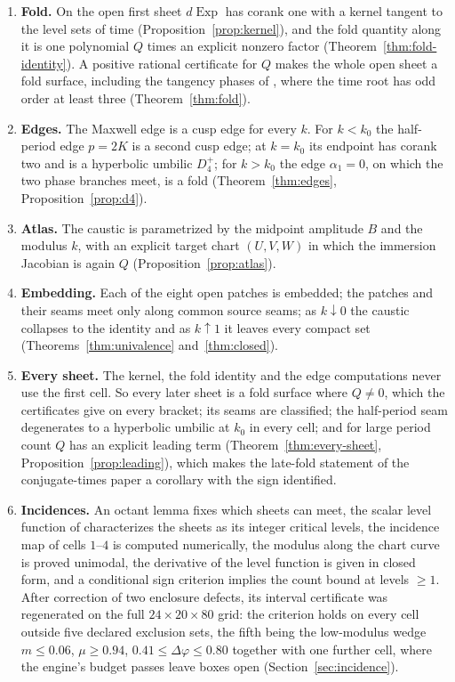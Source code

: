 \documentclass[11pt]{article}
\theoremstyle{remark}
\newcommand{\Exp}{\operatorname{Exp}}
\begin{document}
\begin{enumerate}[nosep,leftmargin=*]
\item \textbf{Fold.}  On the open first sheet $d\Exp$ has corank one with a
      kernel tangent to the level sets of time
      (Proposition~\ref{prop:kernel}), and the fold quantity along it is
      one polynomial $Q$ times an explicit nonzero factor
      (Theorem~\ref{thm:fold-identity}).  A positive rational certificate
      for $Q$ makes the whole open sheet a fold surface, including the
      tangency phases of \cite[Lemma~3.3]{SE2FirstConjugate}, where the
      time root has odd order at least three (Theorem~\ref{thm:fold}).
\item \textbf{Edges.}  The Maxwell edge is a cusp edge for every $k$.  For
      $k<k_0$ the half-period edge $p=2K$ is a second cusp edge; at
      $k=k_0$ its endpoint has corank two and is a hyperbolic umbilic
      $D_4^+$; for $k>k_0$ the edge $\alpha_1=0$, on which the two phase
      branches meet, is a fold (Theorem~\ref{thm:edges},
      Proposition~\ref{prop:d4}).
\item \textbf{Atlas.}  The caustic is parametrized by the midpoint
      amplitude $B$ and the modulus $k$, with an explicit target chart
      $(U,V,W)$ in which the immersion Jacobian is again $Q$
      (Proposition~\ref{prop:atlas}).
\item \textbf{Embedding.}  Each of the eight open patches is embedded; the
      patches and their seams meet only along common source seams; as
      $k\downarrow0$ the caustic collapses to the identity and as
      $k\uparrow1$ it leaves every compact set
      (Theorems~\ref{thm:univalence} and~\ref{thm:closed}).
\item \textbf{Every sheet.}  The kernel, the fold identity and the edge
      computations never use the first cell.  So every later sheet is a
      fold surface where $Q\ne0$, which the certificates give on every
      bracket; its seams are classified; the half-period seam degenerates
      to a hyperbolic umbilic at $k_0$ in every cell; and for large period
      count $Q$ has an explicit leading term (Theorem~\ref{thm:every-sheet},
      Proposition~\ref{prop:leading}), which makes the late-fold statement
      of the conjugate-times paper a corollary with the sign identified.
\item \textbf{Incidences.}  An octant lemma fixes which sheets can meet,
      the scalar level function of \cite{SE2Counts} characterizes the
      sheets as its integer critical levels, the incidence map of cells
      $1$--$4$ is computed numerically, the modulus along the chart curve is proved
      unimodal, the derivative of the level function is given in closed
      form, and a conditional sign criterion implies the count bound at
      levels $\ge1$.  After correction of two enclosure defects, its
      interval certificate was regenerated on the full $24\times20\times80$
      grid: the criterion holds on every cell outside five declared
      exclusion sets, the fifth being the low-modulus wedge
      $m\le0.06$, $\mu\ge0.94$, $0.41\le\Delta\varphi\le0.80$ together
      with one further cell, where the engine's budget passes leave
      boxes open (Section~\ref{sec:incidence}).
\end{enumerate}
\end{document}
